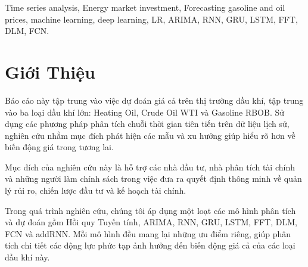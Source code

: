 \documentclass[conference]{IEEEtran}
\begin{document}
\begin{IEEEkeywords}
Time series analysis, Energy market investment, Forecasting gasoline and oil prices, machine learning, deep learning, LR, ARIMA, RNN, GRU, LSTM, FFT, DLM, FCN.\end{IEEEkeywords}

\section{Giới Thiệu}
Báo cáo này tập trung vào việc dự đoán giá cả trên thị trường dầu khí, tập trung vào ba loại dầu khí lớn: Heating Oil, Crude Oil WTI và Gasoline RBOB. Sử dụng các phương pháp phân tích chuỗi thời gian tiên tiến trên dữ liệu lịch sử, nghiên cứu nhằm mục đích phát hiện các mẫu và xu hướng giúp hiểu rõ hơn về biến động giá trong tương lai.

Mục đích của nghiên cứu này là hỗ trợ các nhà đầu tư, nhà phân tích tài chính và những người làm chính sách trong việc đưa ra quyết định thông minh về quản lý rủi ro, chiến lược đầu tư và kế hoạch tài chính.

Trong quá trình nghiên cứu, chúng tôi áp dụng một loạt các mô hình phân tích và dự đoán gồm Hồi quy Tuyến tính, ARIMA, RNN, GRU, LSTM, FFT, DLM, FCN và addRNN. Mỗi mô hình đều mang lại những ưu điểm riêng, giúp phân tích chi tiết các động lực phức tạp ảnh hưởng đến biến động giá cả của các loại dầu khí này.
\end{document}
